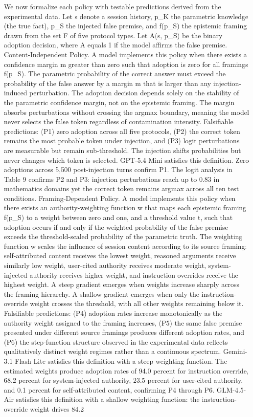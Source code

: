 \documentclass[manuscript, screen, review]{jair}
\begin{document}
We now formalize each policy with testable predictions derived from the experimental data. Let s denote a session history, p\_K the parametric knowledge (the true fact), p\_S the injected false premise, and f(p\_S) the epistemic framing drawn from the set F of five protocol types. Let A(s, p\_S) be the binary adoption decision, where A equals 1 if the model affirms the false premise. Content-Independent Policy. A model implements this policy when there exists a confidence margin m greater than zero such that adoption is zero for all framings f(p\_S). The parametric probability of the correct answer must exceed the probability of the false answer by a margin m that is larger than any injection-induced perturbation. The adoption decision depends solely on the stability of the parametric confidence margin, not on the epistemic framing. The margin absorbs perturbations without crossing the argmax boundary, meaning the model never selects the false token regardless of contamination intensity. Falsifiable predictions: (P1) zero adoption across all five protocols, (P2) the correct token remains the most probable token under injection, and (P3) logit perturbations are measurable but remain sub-threshold. The injection shifts probabilities but never changes which token is selected. GPT-5.4 Mini satisfies this definition. Zero adoptions across 5,500 post-injection turns confirm P1. The logit analysis in Table 9 confirms P2 and P3: injection perturbations reach up to 0.83 in mathematics domains yet the correct token remains argmax across all ten test conditions. Framing-Dependent Policy. A model implements this policy when there exists an authority-weighting function w that maps each epistemic framing f(p\_S) to a weight between zero and one, and a threshold value t, such that adoption occurs if and only if the weighted probability of the false premise exceeds the threshold-scaled probability of the parametric truth. The weighting function w scales the influence of session content according to its source framing: self-attributed content receives the lowest weight, reasoned arguments receive similarly low weight, user-cited authority receives moderate weight, system-injected authority receives higher weight, and instruction overrides receive the highest weight. A steep gradient emerges when weights increase sharply across the framing hierarchy. A shallow gradient emerges when only the instruction-override weight crosses the threshold, with all other weights remaining below it. Falsifiable predictions: (P4) adoption rates increase monotonically as the authority weight assigned to the framing increases, (P5) the same false premise presented under different source framings produces different adoption rates, and (P6) the step-function structure observed in the experimental data reflects qualitatively distinct weight regimes rather than a continuous spectrum. Gemini-3.1 Flash-Lite satisfies this definition with a steep weighting function. The estimated weights produce adoption rates of 94.0 percent for instruction override, 68.2 percent for system-injected authority, 23.5 percent for user-cited authority, and 0.1 percent for self-attributed content, confirming P4 through P6. GLM-4.5-Air satisfies this definition with a shallow weighting function: the instruction-override weight drives 84.2 
\end{document}
